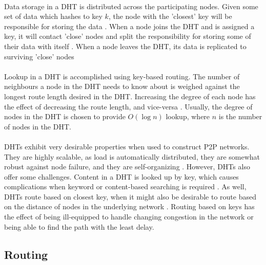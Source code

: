 \documentclass[12pt,letterpaper]{article}
\begin{document}
\paragraph{}
Data storage in a DHT is distributed across the participating nodes.
Given some set of data which hashes to key $k$, the node with the 'closest' key will be responsible for storing the data \cite{dht-ietf}.
When a node joins the DHT and is assigned a key, it will contact 'close' nodes and split the responsibility for storing some of their data with itself \cite{dht-ietf}.
When a node leaves the DHT, its data is replicated to surviving 'close' nodes \cite{dht-ietf}

\paragraph{}
Lookup in a DHT is accomplished using key-based routing.
The number of neighbours a node in the DHT needs to know about is weighed against the longest route length desired in the DHT.
Increasing the degree of each node has the effect of decreasing the route length, and vice-versa \cite{wiki-dht}.
Usually, the degree of nodes in the DHT is chosen to provide $O(\log n)$ lookup, where $n$ is the number of nodes in the DHT.

\paragraph{}
DHTs exhibit very desirable properties when used to construct P2P networks.
They are highly scalable, as load is automatically distributed, they are somewhat robust against node failure, and they are self-organizing \cite{dht-ietf}.
However, DHTs also offer some challenges.
Content in a DHT is looked up by key, which causes complications when keyword or content-based searching is required \cite{dht}\cite{dht-ietf}.
As well, DHTs route based on closest key, when it might also be desirable to route based on the distance of nodes in the underlying network \cite{dht}.
Routing based on keys has the effect of being ill-equipped to handle changing congestion in the network or being able to find the path with the least delay.

\subsection{Routing}
\end{document}
